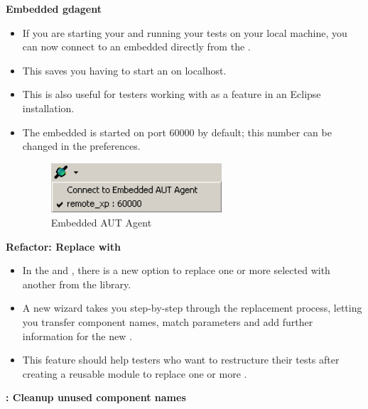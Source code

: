 
\textbf{Embedded gdagent{}}\\
\begin{itemize}
\item If you are starting your \gdaut{} and running your tests on your local machine, 
you can now connect to an embedded \gdagent{} directly from the \ite. 
\item This saves you having to start an \gdagent{} on localhost. 
\item This is also useful for testers working with \jb{} as a feature in an Eclipse installation. 
\item The embedded \gdagent{} is started on port 60000 by default; this number can be changed in the preferences.

\begin{figure}[h]
\begin{center}
\includegraphics[width=0.60\textwidth]{52/ps/EmbeddedAgent}
\caption{Embedded AUT Agent}
\label{RNEmbeddedAgent}
\end{center}
\end{figure}


\end{itemize}


\textbf{Refactor: Replace with \gdcase{}}
\begin{itemize}
\item In the \gdtestcaseeditor{} and \gdtestsuiteeditor{}, there is a new option to replace one or more selected \gdcases{} with another \gdcase{} from the library. 
\item A new wizard takes you step-by-step through the replacement process, letting you transfer component names, match parameters and add further information for the new \gdcase{}.
\item This feature should help testers who want to restructure their tests after creating a reusable module to replace one or more \gdcases{}. 
\end{itemize}

\textbf{\gdomeditor{}: Cleanup unused component names}


